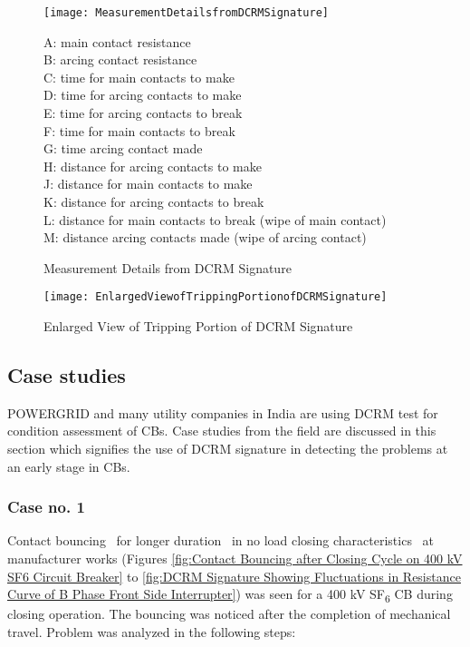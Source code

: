 \begin{figure}[!htbp]
\centering
\begin{minipage}{\textwidth}
\centering
\texttt{[image: MeasurementDetailsfromDCRMSignature]}
\caption{Measurement Details from DCRM Signature}
\label{fig:Measurement Details from DCRM Signature}
\begin{flushleft}
\footnotesize A: main contact resistance\\
B: arcing contact resistance\\
C: time for main contacts to make\\
D: time for arcing contacts to make\\
E: time for arcing contacts to break\\
F: time for main contacts to break\\
G: time arcing contact made\\
H: distance for arcing contacts to make\\
J: distance for main contacts to make\\
K: distance for arcing contacts to break\\
L: distance for main contacts to break (wipe of main contact)\\
M: distance arcing contacts made (wipe of arcing contact)\\
\end{flushleft}
\end{minipage}
\end{figure}

\begin{figure}[!htbp]
    \centering
    \texttt{[image: EnlargedViewofTrippingPortionofDCRMSignature]}
    \caption{Enlarged View of Tripping Portion of DCRM Signature}
    \label{fig:Enlarged View of Tripping Portion of DCRM Signature}
\end{figure}

\subsection{Case studies}
POWERGRID and many utility companies in India are using DCRM test for condition assessment of CBs. Case studies from the field are discussed in this section which signifies the use of DCRM signature in detecting the problems at an early stage in CBs.

\subsubsection*{Case no. 1}
Contact bouncing~ for longer duration~ in no load closing characteristics~ at manufacturer works (Figures \ref{fig:Contact Bouncing after Closing Cycle on 400 kV SF6 Circuit Breaker} to \ref{fig:DCRM Signature Showing Fluctuations in Resistance Curve of B Phase Front Side Interrupter}) was seen for a 400 kV SF\textsubscript{6} CB during closing operation. The bouncing was noticed after the completion of mechanical travel. Problem was analyzed in the following steps:

